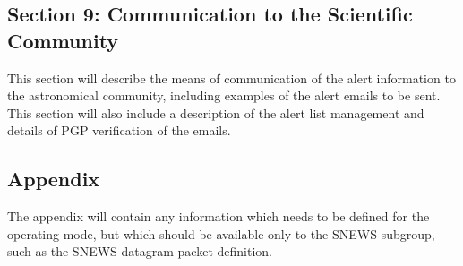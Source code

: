 \documentclass{article}
\begin{document}
\subsection*{Section 9: Communication to the Scientific Community}

This section will describe the means of communication
of the alert information to the astronomical community, including
examples of the alert emails to be sent.
This section will also include a description of the alert list management
and details of PGP verification of the emails.


\subsection{Appendix}

The appendix will contain any information which needs to be defined
for the operating mode, but which should be available only
to the SNEWS subgroup, such as the SNEWS datagram packet definition.
\end{document}
